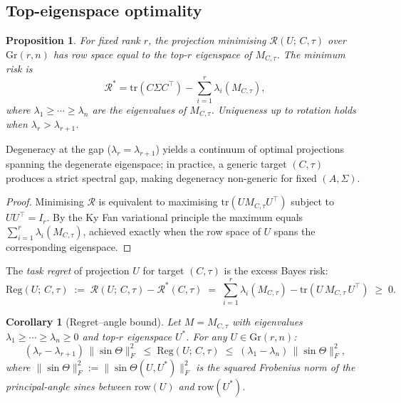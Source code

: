\documentclass[final,3p,times]{elsarticle}
\newtheorem{proposition}[theorem]{Proposition}
\newtheorem{corollary}[theorem]{Corollary}
\newcommand{\Gr}{\mathrm{Gr}}
\newcommand{\tr}{\mathrm{tr}}
\begin{document}
\subsection{Top-eigenspace optimality}

\begin{proposition}\label{prop:opt}
For fixed rank $r$, the projection minimising $\mathcal{R}(U;\,C,\tau)$ over
$\Gr(r,n)$ has row space equal to the top-$r$ eigenspace of $M_{C,\tau}$.
The minimum risk is
\begin{equation}
  \mathcal{R}^*
    = \tr(C\Sigma C^\top) - \sum_{i=1}^{r} \lambda_i(M_{C,\tau}),
\end{equation}
where $\lambda_1 \ge \cdots \ge \lambda_n$ are the eigenvalues of $M_{C,\tau}$.
Uniqueness up to rotation holds when $\lambda_r > \lambda_{r+1}$.
\end{proposition}

Degeneracy at the gap ($\lambda_r = \lambda_{r+1}$) yields a continuum of
optimal projections spanning the degenerate eigenspace; in practice, a generic
target $(C,\tau)$ produces a strict spectral gap, making degeneracy
non-generic for fixed $(A,\Sigma)$.

\begin{proof}
Minimising $\mathcal{R}$ is equivalent to maximising
$\tr(U M_{C,\tau} U^\top)$ subject to $UU^\top = I_r$.
By the Ky Fan variational principle \cite{Fan1949,HornJohnson2013}
the maximum equals
$\sum_{i=1}^r \lambda_i(M_{C,\tau})$, achieved exactly when the row space of
$U$ spans the corresponding eigenspace.
\end{proof}

The \emph{task regret} of projection $U$ for target $(C,\tau)$ is the excess
Bayes risk:
\begin{equation}\label{eq:regret}
  \mathrm{Reg}(U;\,C,\tau)
  \;:=\;
  \mathcal{R}(U;\,C,\tau) - \mathcal{R}^*(C,\tau)
  \;=\;
  \sum_{i=1}^r\lambda_i(M_{C,\tau})-\tr(U\,M_{C,\tau}\,U^\top)
  \;\ge\; 0.
\end{equation}

\begin{corollary}[Regret--angle bound]\label{cor:regretbound}
Let $M=M_{C,\tau}$ with eigenvalues $\lambda_1\ge\cdots\ge\lambda_n\ge 0$
and top-$r$ eigenspace $U^*$.
For any $U\in\Gr(r,n)$:
\begin{equation}\label{eq:regretbound}
  (\lambda_r-\lambda_{r+1})\,\|\sin\Theta\|_F^2
  \;\le\;
  \mathrm{Reg}(U;\,C,\tau)
  \;\le\;
  (\lambda_1-\lambda_n)\,\|\sin\Theta\|_F^2,
\end{equation}
where $\|\sin\Theta\|_F^2:=\|\sin\Theta(U,U^*)\|_F^2$
\textup{\cite{BjorckGolub1973}} is the squared Frobenius norm of the
principal-angle sines between $\mathrm{row}(U)$ and $\mathrm{row}(U^*)$.
\end{corollary}
\end{document}
